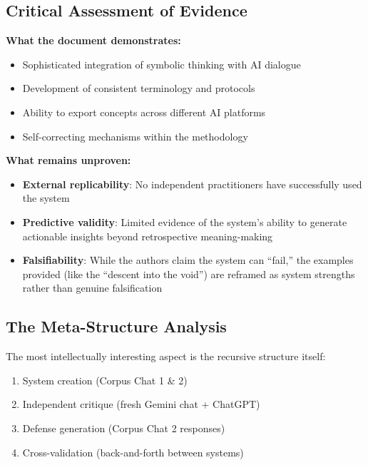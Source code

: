 \documentclass{article}
\begin{document}
\subsection*{Critical Assessment of Evidence}\label{critical-assessment-of-evidence-1}

\textbf{What the document demonstrates:}

\begin{itemize}
\item Sophisticated integration of symbolic thinking with AI dialogue\\
\item Development of consistent terminology and protocols\\
\item Ability to export concepts across different AI platforms\\
\item Self-correcting mechanisms within the methodology
\end{itemize}

\textbf{What remains unproven:}

\begin{itemize}
\item \textbf{External replicability}: No independent practitioners have successfully used the system\\
\item \textbf{Predictive validity}: Limited evidence of the system's ability to generate actionable insights beyond retrospective meaning-making\\
\item \textbf{Falsifiability}: While the authors claim the system can ``fail,'' the examples provided (like the ``descent into the void'') are reframed as system strengths rather than genuine falsification
\end{itemize}

\subsection*{The Meta-Structure Analysis}\label{the-meta-structure-analysis-1}

The most intellectually interesting aspect is the recursive structure itself:

\begin{enumerate}
\item System creation (Corpus Chat 1 \& 2)\\
\item Independent critique (fresh Gemini chat + ChatGPT)\\
\item Defense generation (Corpus Chat 2 responses)\\
\item Cross-validation (back-and-forth between systems)
\end{enumerate}
\end{document}
